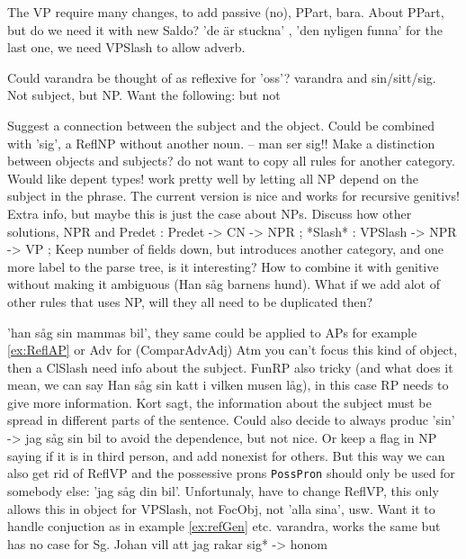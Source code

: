 \documentclass{report}
\begin{document}
The VP require many changes, to add passive (no), PPart, bara.
About PPart, but do we need it with new Saldo? 'de är stuckna' , 'den nyligen funna'
for the last one, we need VPSlash to allow adverb.


Could varandra be thought of as reflexive for 'oss'?
varandra and sin/sitt/sig. Not subject, but NP.
Want the following:
but not
\label{ex:refGen}
\label{ex:ReflAP}

Suggest a connection between the subject and the object.
Could be combined with 'sig', a ReflNP without another noun.
-- man ser sig!!
Make a distinction between objects and subjects?
do not want to copy all rules for another category. Would like depent types!
work pretty well by letting all NP depend on the subject in the phrase.
The current version is nice and works for recursive genitivs!
Extra info, but maybe this is just the case about NPs.
Discuss how other solutions, NPR and Predet : Predet -> CN -> NPR ;
*Slash* : VPSlash -> NPR -> VP ;
Keep number of fields down, but introduces another category, and one more
label to the parse tree, is it interesting? How to combine it with genitive 
without making it ambiguous (Han såg barnens hund).
What if we add alot of other rules that uses NP, will they all need to be
duplicated then?

'han såg sin mammas bil', they same could be applied to
APs for example \ref{ex:ReflAP} or Adv for
 (ComparAdvAdj)
Atm you can't focus this kind of object, then a ClSlash need info about the
subject. FunRP also tricky (and what does it mean, we can say
Han såg sin katt i vilken musen låg), in this case RP needs to give more information.
Kort sagt, the information about the subject must be spread
in different parts of the sentence. 
Could also decide to always produc 'sin' -> jag såg sin bil
to avoid the dependence, but not nice. Or keep a flag in NP saying if it is
in third person, and add nonexist for others. But this way we can also get rid
of ReflVP and the possessive prons \verb|PossPron| should only be used for somebody else:
'jag såg din bil'.
Unfortunaly, have to change ReflVP, this only allows this in object for VPSlash, not FocObj,
not 'alla sina', usw. Want it to handle conjuction as in example \ref{ex:refGen}
etc.
varandra, works the same but has no case for Sg.
Johan vill att jag rakar sig* -> honom  
\end{document}
